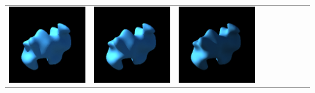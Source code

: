 \begin{center}
\begin{longtable}{@{}c@{}c@{}c@{}c@{}c@{}c@{}c@{}c@{}c@{}}
\includegraphics[width=0.1\linewidth]{training/41_5.png} & \includegraphics[width=0.1\linewidth]{training/41_6.png} &
\includegraphics[width=0.1\linewidth]{training/41_7.png} \\
\end{longtable}
\end{center}

